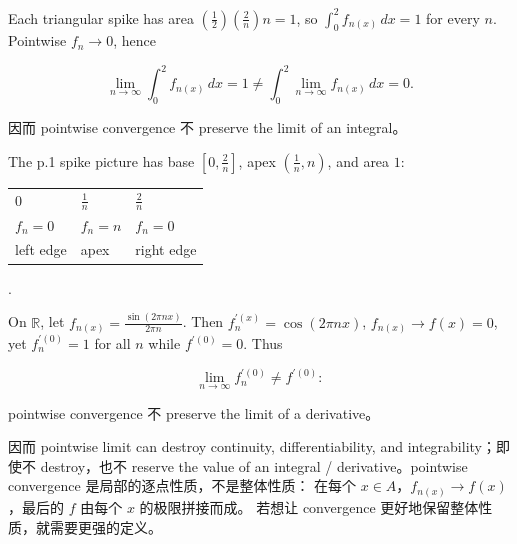 \begin{example}
Each triangular spike has area \(\left( \frac{1}{2} \right)\left( \frac{2}{n} \right)n = 1\), so \(\int_{0}^{2}f_{n{(x)}}\, dx = 1\) for every \(n\). Pointwise \(f_{n}\rightarrow 0\), hence

\[\lim\limits_{n\rightarrow\infty}\int_{0}^{2}f_{n{(x)}}\, dx = 1 \neq \int_{0}^{2}\lim\limits_{n\rightarrow\infty}f_{n{(x)}}\, dx = 0.\]

因而 pointwise convergence 不 preserve the limit of an integral。

The p.1 spike picture has base \(\left\lbrack {0,\frac{2}{n}} \right\rbrack\), apex \(\left( {\frac{1}{n},n} \right)\), and area \(1\):

{\def\LTcaptype{none} %
\begin{longtable}[]{@{}lll@{}}
\toprule\noalign{}
\endhead
\bottomrule\noalign{}
\endlastfoot
\(0\) & \(\frac{1}{n}\) & \(\frac{2}{n}\) \\
\(f_{n} = 0\) & \(f_{n} = n\) & \(f_{n} = 0\) \\
left edge & apex & right edge \\
\end{longtable}
}

.

On \(\mathbb{R}\), let \(f_{n{(x)}} = \frac{\sin\left( {2\pi nx} \right)}{2\pi n}\). Then \(f_{n}^{'{(x)}} = \cos\left( {2\pi nx} \right)\), \(f_{n{(x)}}\rightarrow f(x) = 0\), yet \(f_{n}^{'{(0)}} = 1\) for all \(n\) while \(f^{'{(0)}} = 0\). Thus

\[\lim\limits_{n\rightarrow\infty}f_{n}^{'{(0)}} \neq f^{'{(0)}}:\]

pointwise convergence 不 preserve the limit of a derivative。

因而 pointwise limit can destroy continuity, differentiability, and integrability；即使不 destroy，也不 reserve the value of an integral / derivative。pointwise convergence 是局部的逐点性质，不是整体性质： 在每个 \(x \in A\)，\(f_{n{(x)}}\rightarrow f(x)\)，最后的 \(f\) 由每个 \(x\) 的极限拼接而成。 若想让 convergence 更好地保留整体性质，就需要更强的定义。

\end{example}


